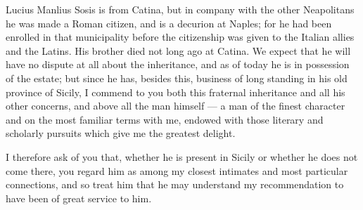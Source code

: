 

 Lucius Manlius Sosis is from Catina, but in company with the other Neapolitans he was made a Roman citizen, and is a decurion at Naples; for he had been enrolled in that municipality before the citizenship was given to the Italian allies and the Latins. His brother died not long ago at Catina. We expect that he will have no dispute at all about the inheritance, and as of today he is in possession of the estate; but since he has, besides this, business of long standing in his old province of Sicily, I commend to you both this fraternal inheritance and all his other concerns, and above all the man himself --- a man of the finest character and on the most familiar terms with me, endowed with those literary and scholarly pursuits which give me the greatest delight.

 I therefore ask of you that, whether he is present in Sicily or whether he does not come there, you regard him as among my closest intimates and most particular connections, and so treat him that he may understand my recommendation to have been of great service to him.
